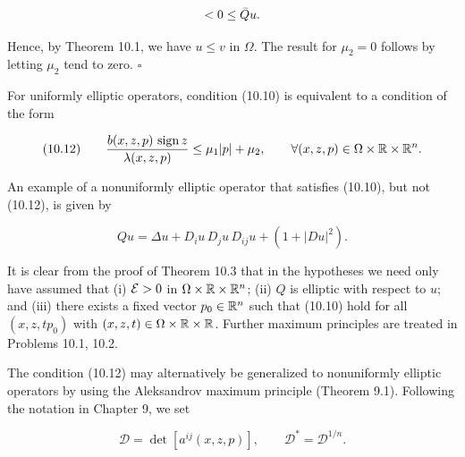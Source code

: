 \begin{theorem}
\[
<0\le \bar{Q} u.
\]

Hence, by Theorem 10.1, we have $u\le v$ in $\Omega$. The result for $\mu_2=0$ follows by letting
$\mu_2$ tend to zero. $\square$

For uniformly elliptic operators, condition (10.10) is equivalent to a condition
of the form

\[
\text{(10.12)}\qquad \frac{b(x,z,p)\,\operatorname{sign} z}{\lambda(x,z,p)}\le \mu_1|p|+\mu_2,
\qquad \forall (x,z,p)\in\Omega\times\mathbb{R}\times\mathbb{R}^n.
\]

An example of a nonuniformly elliptic operator that satisfies (10.10), but not (10.12),
is given by

\[
Qu=\Delta u + D_i u\,D_j u\,D_{ij}u + (1+|Du|^2).
\]

It is clear from the proof of Theorem 10.3 that in the hypotheses we need only have
assumed that (i) $\mathcal{E}>0$ in $\Omega\times\mathbb{R}\times\mathbb{R}^n$; (ii) $Q$ is elliptic with respect to $u$; and (iii)
there exists a fixed vector $p_0\in\mathbb{R}^n$ such that (10.10) hold for all $(x,z,tp_0)$ with
$(x,z,t)\in\Omega\times\mathbb{R}\times\mathbb{R}$. Further maximum principles are treated in Problems 10.1,
10.2.

The condition (10.12) may alternatively be generalized to nonuniformly elliptic
operators by using the Aleksandrov maximum principle (Theorem 9.1). Following
the notation in Chapter 9, we set

\[
\mathscr{D}=\det[a^{ij}(x,z,p)],\qquad \mathscr{D}^*=\mathscr{D}^{1/n}.
\]

\end{theorem}

